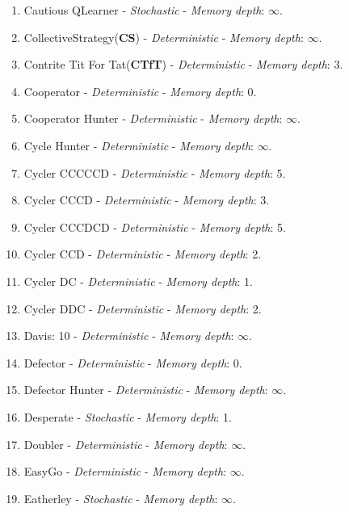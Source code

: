 \documentclass[10pt,letterpaper]{article}
\begin{document}
\begin{enumerate}
\item Cautious QLearner - \textit{Stochastic} - \textit{Memory depth}: \(\infty\). \cite{axelrodproject}
\item CollectiveStrategy(\textbf{CS}) - \textit{Deterministic} - \textit{Memory depth}: \(\infty\). \cite{Li2009}
\item Contrite Tit For Tat(\textbf{CTfT}) - \textit{Deterministic} - \textit{Memory depth}: 3. \cite{Axelrod1995}
\item Cooperator - \textit{Deterministic} - \textit{Memory depth}: 0. \cite{Axelrod1984, Mittal2009, Press2012}
\item Cooperator Hunter - \textit{Deterministic} - \textit{Memory depth}: \(\infty\). \cite{axelrodproject}
\item Cycle Hunter - \textit{Deterministic} - \textit{Memory depth}: \(\infty\). \cite{axelrodproject}
\item Cycler CCCCCD - \textit{Deterministic} - \textit{Memory depth}: 5. \cite{axelrodproject}
\item Cycler CCCD - \textit{Deterministic} - \textit{Memory depth}: 3. \cite{axelrodproject}
\item Cycler CCCDCD - \textit{Deterministic} - \textit{Memory depth}: 5. \cite{axelrodproject}
\item Cycler CCD - \textit{Deterministic} - \textit{Memory depth}: 2. \cite{Mittal2009}
\item Cycler DC - \textit{Deterministic} - \textit{Memory depth}: 1. \cite{axelrodproject}
\item Cycler DDC - \textit{Deterministic} - \textit{Memory depth}: 2. \cite{Mittal2009}
\item Davis: 10 - \textit{Deterministic} - \textit{Memory depth}: \(\infty\). \cite{Axelrod1980a}
\item Defector - \textit{Deterministic} - \textit{Memory depth}: 0. \cite{Axelrod1984, Mittal2009, Press2012}
\item Defector Hunter - \textit{Deterministic} - \textit{Memory depth}: \(\infty\). \cite{axelrodproject}
\item Desperate - \textit{Stochastic} - \textit{Memory depth}: 1. \cite{Berg2015}
\item Doubler - \textit{Deterministic} - \textit{Memory depth}: \(\infty\). \cite{Prison1998}
\item EasyGo - \textit{Deterministic} - \textit{Memory depth}: \(\infty\). \cite{Li2011, Prison1998}
\item Eatherley - \textit{Stochastic} - \textit{Memory depth}: \(\infty\). \cite{Axelrod1980b}

\end{enumerate}
\end{document}
